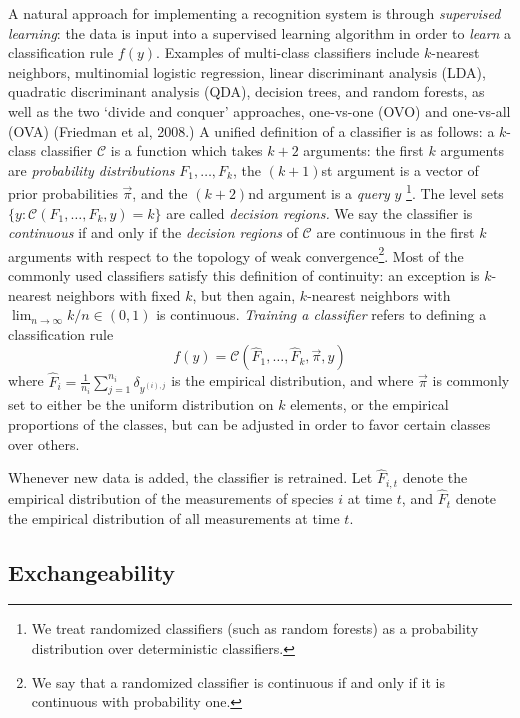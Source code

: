 \documentclass{article}
\begin{document}
A natural approach for implementing a recognition system is through
\emph{supervised learning}: the data is input into a supervised
learning algorithm in order to \emph{learn} a classification rule
$f(y)$.  Examples of multi-class classifiers include $k$-nearest
neighbors, multinomial logistic regression, linear discriminant
analysis (LDA), quadratic discriminant analysis (QDA), decision trees,
and random forests, as well as the two `divide and conquer'
approaches, one-vs-one (OVO) and one-vs-all (OVA) (Friedman et al,
2008.)  A unified definition of a classifier is as follows: a
$k$-class classifier $\mathcal{C}$ is a function which takes $k+2$
arguments: the first $k$ arguments are \emph{probability
  distributions} $F_1,\hdots, F_k$, the $(k+1)$st argument is a vector
of prior probabilities $\vec{\pi}$, and the $(k+2)$nd argument is a
\emph{query} $y$
\footnote{We treat randomized classifiers (such as random forests) as
  a probability distribution over deterministic classifiers.}.  The
level sets $\{y: \mathcal{C}(F_1,\hdots, F_k, y) = k\}$ are called
\emph{decision regions.}  We say the classifier is \emph{continuous}
if and only if the \emph{decision regions} of $\mathcal{C}$ are
continuous in the first $k$ arguments with respect to the topology of
weak convergence\footnote{We say that a randomized classifier is
  continuous if and only if it is continuous with probability one.}.
Most of the commonly used classifiers satisfy this definition of
continuity: an exception is $k$-nearest neighbors with fixed $k$, but
then again, $k$-nearest neighbors with $\lim_{n \to \infty} k/n \in
(0, 1)$ is continuous.  \emph{Training a classifier} refers to
defining a classification rule
\[
f(y) = \mathcal{C}(\hat{F}_1,\hdots, \hat{F}_k, \vec{\pi}, y)
\]
where $\hat{F}_i = \frac{1}{n_i}\sum_{j=1}^{n_i} \delta_{y^{(i), j}}$
is the empirical distribution, and where $\vec{\pi}$ is commonly set
to either be the uniform distribution on $k$ elements, or the
empirical proportions of the classes, but can be adjusted in order to
favor certain classes over others.

Whenever new data is added, the classifier is retrained.  
Let $\hat{F}_{i, t}$ denote the empirical distribution of the
measurements of species $i$ at time $t$, and $\hat{F}_t$ denote the
empirical distribution of all measurements at time $t$.

\subsection{Exchangeability}
\end{document}
